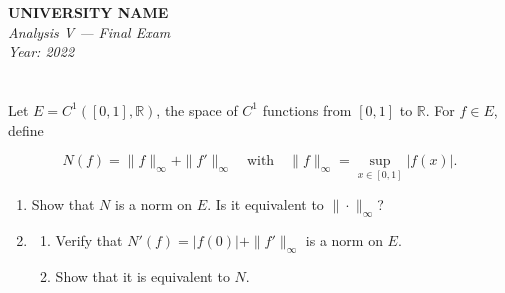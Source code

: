 \documentclass[12pt]{article}
\begin{document}
\begin{center}
  \Large\textbf{UNIVERSITY NAME} \\[1em]
  \large\textit{Analysis V — Final Exam} \\[0.5em]
  \large\textit{Year: 2022} \\[2em]
\end{center}

\vspace{0.5cm}

\section{}
Let \( E = C^1([0,1], \mathbb{R}) \), the space of \( C^1 \) functions from \([0,1]\) to \(\mathbb{R}\). For \( f \in E \), define

\[
N(f) = \|f\|_{\infty} + \|f'\|_{\infty} \quad \text{with} \quad \|f\|_{\infty} = \sup_{x \in [0,1]} |f(x)|.
\]

\begin{enumerate}
    \item Show that \( N \) is a norm on \( E \). Is it equivalent to \( \|\cdot\|_{\infty} \)?
    
    \item 
    \begin{enumerate}
        \item Verify that \( N'(f) = |f(0)| + \|f'\|_{\infty} \) is a norm on \( E \).
        \item Show that it is equivalent to \( N \).
    \end{enumerate}
\end{enumerate}
\end{document}
